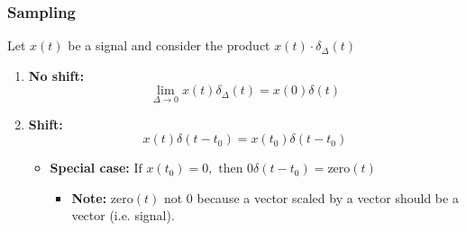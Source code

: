     \subsubsection{Sampling}
    \begin{definition}
        Let $x(t)$ be a signal and consider the product $x(t) \cdot \delta_{\Delta} (t)$

        \begin{enumerate}
            \item \textbf{No shift:}
            \begin{equation}
                \lim_{\Delta \to 0} x(t) \delta_{\Delta}(t) = x(0) \delta(t)
            \end{equation}

            \item \textbf{Shift:}
            \begin{equation}
                x(t) \delta(t - t_0) = x(t_0) \delta(t - t_0)                
            \end{equation}

            \begin{itemize}
                \item \textbf{Special case:} $\text{If } x(t_0) = 0, \text{ then } 0 \delta(t - t_0) = \text{zero}(t)$ 
                \begin{itemize}
                    \item \textbf{Note:} $\text{zero}(t)$ not $0$ because a vector scaled by a vector should be a vector (i.e. signal).
                \end{itemize}
            \end{itemize} 
        \end{enumerate}
    \end{definition}